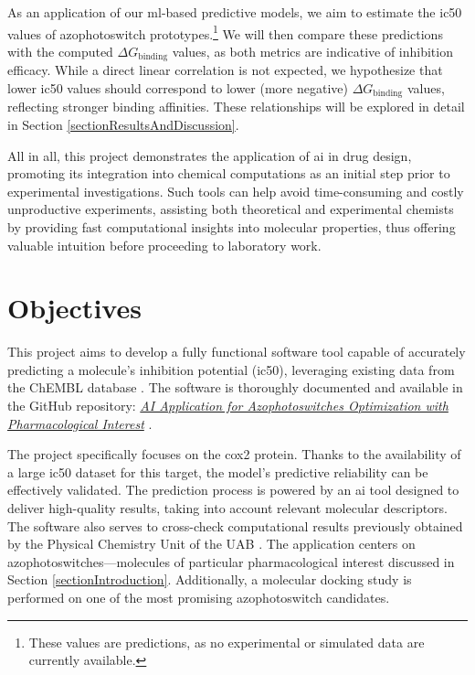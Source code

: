 \documentclass[11pt]{article}
\begin{document}
As an application of our \gls{ml}-based predictive models, we aim to estimate the \gls{ic50} values of azophotoswitch prototypes.\footnote{These values are predictions, as no experimental or simulated data are currently available.} We will then compare these predictions with the computed $\Delta G_{\text{binding}}$ values, as both metrics are indicative of inhibition efficacy. While a direct linear correlation is not expected, we hypothesize that lower \gls{ic50} values should correspond to lower (more negative) $\Delta G_{\text{binding}}$ values, reflecting stronger binding affinities. These relationships will be explored in detail in Section \ref{sectionResultsAndDiscussion}.

All in all, this project demonstrates the application of \gls{ai} in drug design, promoting its integration into chemical computations as an initial step prior to experimental investigations. Such tools can help avoid time-consuming and costly unproductive experiments, assisting both theoretical and experimental chemists by providing fast computational insights into molecular properties, thus offering valuable intuition before proceeding to laboratory work.

\newpage
\section{Objectives}

This project aims to develop a fully functional software tool capable of accurately predicting a molecule’s inhibition potential (\gls{ic50}), leveraging existing data from the ChEMBL database \cite{ChemblDatabase}. The software is thoroughly documented and available in the GitHub repository: \href{https://github.com/SirSergi0/Repository—AI-application-for-azophotoswitches-optimization-with-pharmacological-interest}{\emph{AI Application for Azophotoswitches Optimization with Pharmacological Interest}} \cite{GitHub}.

The project specifically focuses on the \gls{cox2} protein. Thanks to the availability of a large \gls{ic50} dataset for this target, the model’s predictive reliability can be effectively validated. The prediction process is powered by an \gls{ai} tool designed to deliver high-quality results, taking into account relevant molecular descriptors. The software also serves to cross-check computational results previously obtained by the Physical Chemistry Unit of the UAB \cite{UAB_ComputationalChemistry}. The application centers on azophotoswitches—molecules of particular pharmacological interest discussed in Section \ref{sectionIntroduction}. Additionally, a molecular docking study is performed on one of the most promising azophotoswitch candidates.
\end{document}
